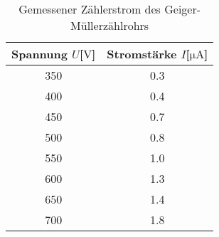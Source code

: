 \begin{table}
\centering
\caption{Gemessener Zählerstrom des Geiger-Müllerzählrohrs}
\label{tab:ogemessdaten2}
\begin{tabular}{c c}
    \toprule
    Spannung $U$[$\si{\volt}$] & Stromstärke $I$[$\si{\micro\ampere}$]\\
    \midrule
    350   & 0.3 \\
    400	  & 0.4 \\
    450	  & 0.7 \\
    500	  & 0.8 \\
    550	  & 1.0 \\
    600	  & 1.3 \\
    650	  & 1.4 \\
    700	  & 1.8 \\
    \bottomrule
\end{tabular}
\end{table}
